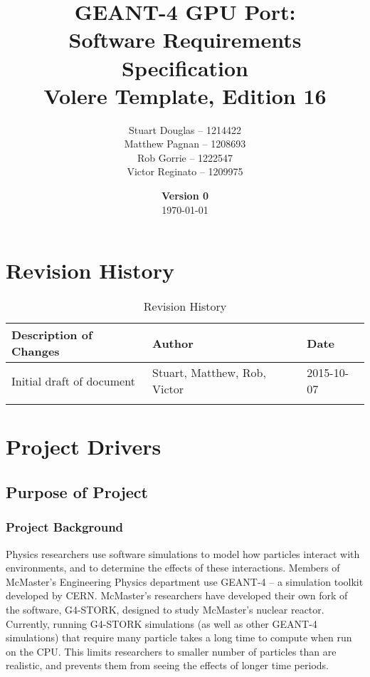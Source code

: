 \documentclass[12pt]{article}
\title{
\LARGE GEANT-4 GPU Port:
\\\vspace{10mm}
\large \textbf{Software Requirements Specification}
\\Volere Template, Edition 16
\vspace{40mm}
}
\author{
Stuart Douglas -- 1214422
\\Matthew Pagnan -- 1208693
\\Rob Gorrie -- 1222547
\\Victor Reginato -- 1209975
\vspace{10mm}
}
\date{\vfill \textbf{Version 0}\\ \today}
\begin{document}

\maketitle
\newpage

\tableofcontents
\newpage
{}

\section{Revision History}
\begin{table}[h]
\centering
\caption{Revision History}
\begin{tabular}{l|l|l}
\Xhline{2\arrayrulewidth}
\bf Description of Changes & \bf Author & \bf Date\\\hline
Initial draft of document & Stuart, Matthew, Rob, Victor & 2015-10-07\\
\Xhline{2\arrayrulewidth}
\end{tabular}
\end{table}

\section{Project Drivers}

\subsection{Purpose of Project} %
\subsubsection{Project Background}
Physics researchers use software simulations to model how particles interact with environments, and to determine the effects of these interactions. Members of McMaster's Engineering Physics department use GEANT-4 -- a simulation toolkit developed by CERN. McMaster's researchers have developed their own fork of the software, G4-STORK, designed to study McMaster's nuclear reactor. Currently, running G4-STORK simulations (as well as other GEANT-4 simulations) that require many particle takes a long time to compute when run on the CPU. This limits researchers to smaller number of particles than are realistic, and prevents them from seeing the effects of longer time periods.
\end{document}

